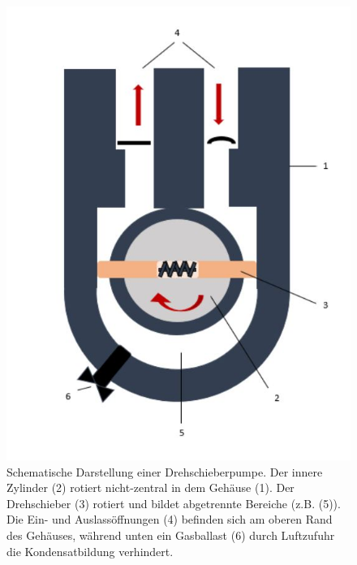 \begin{figure}
  \centering
  \includegraphics[width=\textwidth]{images/pumpe.jpg}
  \caption{Schematische Darstellung einer Drehschieberpumpe. Der innere Zylinder (2) rotiert nicht-zentral in dem Gehäuse (1). Der Drehschieber (3) rotiert und bildet abgetrennte Bereiche (z.B. (5)). Die Ein- und Auslassöffnungen (4) befinden sich am oberen Rand des Gehäuses, während unten ein Gasballast (6) durch Luftzufuhr die Kondensatbildung verhindert. \cite{pumpe}}
  \label{fig:pumpe}
\end{figure}
